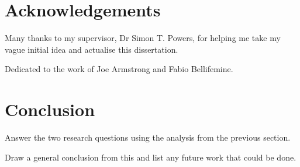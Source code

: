 \documentclass[12pt,a4paper]{article}
\begin{document}

\pagebreak

\pagebreak

\pagebreak

\begin{abstract}
\end{abstract}
\pagebreak

\tableofcontents
\newpage

\listoffigures
\newpage

\renewcommand\lstlistlistingname{List of Listings}
\lstlistoflistings{}
\newpage

\listoftables
\newpage

\section*{Acknowledgements}

Many thanks to my supervisor, Dr Simon T. Powers, for helping me take my vague initial idea and actualise this dissertation.

Dedicated to the work of Joe Armstrong and Fabio Bellifemine.

\newpage









\section{Conclusion}

Answer the two research questions using the analysis from the previous section.

Draw a general conclusion from this and list any future work that could be done.

\setlength{\bibitemsep}{0.5\baselineskip}




\pagebreak

\end{document}
